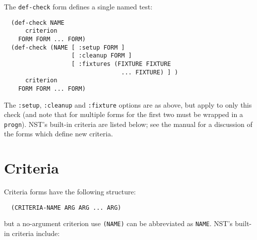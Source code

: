 \documentclass{article}
\newenvironment{criteria}%
{\begin{list}{}
    {\setlength{\labelwidth}{0pt}
     \setlength{\leftmargin}{2em}
     \setlength{\rightmargin}{1em}
     \setlength{\itemindent}{0em}}}%
  {\end{list}}
\def\criterion#1#2#3#4{\item[\bfseries #1] #4\par
  \emph{Syntax:}~~\texttt{#2}\\ \emph{Applicable to:}~~#3}
\begin{document}
The \texttt{def-check} form defines a single named test:
\begin{verbatim}
  (def-check NAME
      criterion
    FORM FORM ... FORM)
  (def-check (NAME [ :setup FORM ]
                   [ :cleanup FORM ]
                   [ :fixtures (FIXTURE FIXTURE
                                 ... FIXTURE) ] )
      criterion
    FORM FORM ... FORM)
\end{verbatim}
The \texttt{:setup}, \texttt{:cleanup} and \texttt{:fixture} options
are as above, but apply to only this check (and note that for multiple
forms for the first two must be wrapped in a \texttt{progn}).  NST's
built-in criteria are listed below; see the manual for a discussion of
the forms which define new criteria.

\section*{Criteria}
Criteria forms have the following structure:
\begin{verbatim}
  (CRITERIA-NAME ARG ARG ... ARG)
\end{verbatim}
but a no-argument criterion use \texttt{(NAME)} can be abbreviated as
\texttt{NAME}.  NST's built-in criteria include:
\def\criteriaGroup#1{\par\textbf{#1.}\begin{criteria}}
\def\endcriteriaGroup{\end{criteria}}
\def\criteriaDoc#1#2#3#4#5#6#7{\criterion{#2}{#3}{#5}{#4}}

\end{document}
